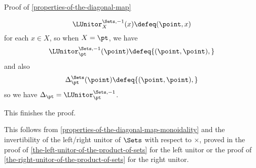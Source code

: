 \begin{Proof}{Proof of \cref{properties-of-the-diagonal-map}}
\begin{enumerate}
            \[
                \LUnitor^{\Sets,-1}_{X}(x)%
                \defeq%
                (\point,x)%
            \]%
            for each $x\in X$, so when $X=\pt$, we have
            \[
                \LUnitor^{\Sets,-1}_{\pt}(\point)%
                \defeq%
                {(\point,\point),}
            \]%
            and also
            \[
                \Delta^{\Sets}_{\pt}(\point)%
                \defeq%
                {(\point,\point),}
            \]%
            so we have $\Delta_{\pt}=\LUnitor^{\Sets,-1}_{\pt}$.
    \end{enumerate}
    This finishes the proof.

    This follows from \cref{properties-of-the-diagonal-map-monoidality} and the invertibility of the left/right unitor of $\Sets$ with respect to $\times$, proved in the proof of \cref{the-left-unitor-of-the-product-of-sets} for the left unitor or the proof of \cref{the-right-unitor-of-the-product-of-sets} for the right unitor.
\end{Proof}
